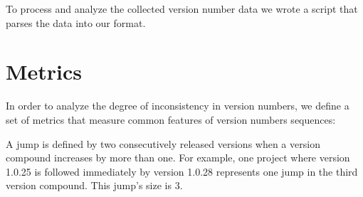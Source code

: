 \documentclass[conference]{IEEEtran}
\begin{document}
 
 
 To process and analyze the collected version number data we wrote a script that parses the data into our format. 












\section{Metrics}


In order to analyze the degree of inconsistency in version numbers, we define 
a set of metrics that measure common features of version numbers sequences: 
 
 A jump is defined by two consecutively released versions when a version compound increases by more than one.
For example, one project where version 1.0.25 is followed immediately by version 1.0.28 represents one jump in the third version compound. This jump's size is 3.
\end{document}
